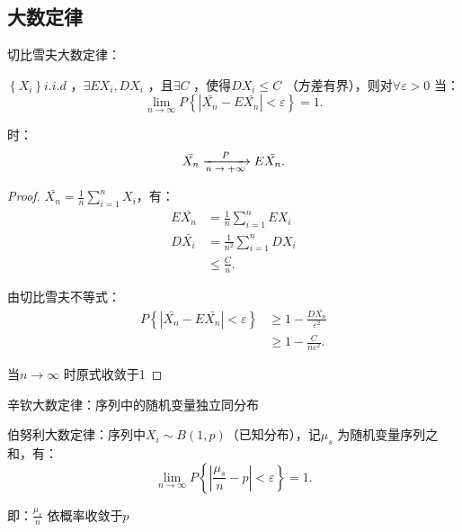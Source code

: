 \subsection{大数定律}%
\label{sub:大数定律}
\begin{notation}
    切比雪夫大数定律：
\end{notation}

\begin{defi}
    $\left\{ X_i \right\} i.i.d$ ，$\exists EX_i,DX_i$ ，且$\exists C$ ，使得$DX_i\le C$ （方差有界），则对$\forall \varepsilon>0$ 当：
    \[
        \lim_{n \to \infty} P\left\{ \left| \bar{X_n}-E\bar{X_n} \right| <\varepsilon \right\} =1
    .\] 

    时：
    \[
        \bar{X_n}\ce{->[$P$][$n\to +\infty $]}E\bar{X_n}
    .\] 
\end{defi}
\begin{proof}
    $\bar{X_n}=\displaystyle{\frac{1}{n} \sum_{i=1}^{n} X_i}$，有：
    \begin{align*}
        E\bar{X_n}&=\frac{1}{n} \sum_{i=1}^{n} EX_i\\
        D\bar{X_i}&=\frac{1}{n^2} \sum_{i=1}^{n} DX_i\\
                  &\le \frac{C}{n}
    .\end{align*}

    由切比雪夫不等式：
    \begin{align*}
        P\left\{ \left| \bar{X_n}-E\bar{X_n} \right| <\varepsilon \right\} &\ge 1-\frac{D\bar{X_n}}{\varepsilon^2}\\
                                                                        &\ge 1-\frac{C}{n\varepsilon^2}
    .\end{align*}

    当$n\to \infty $ 时原式收敛于1
\end{proof}
\begin{notation}
    辛钦大数定律：序列中的随机变量独立同分布
\end{notation}
\begin{notation}
    伯努利大数定律：序列中$X_i\sim B\left( 1,p \right) $（已知分布），记$\mu_s$ 为随机变量序列之和，有：
    \[
        \lim_{n \to \infty} P\left\{ \left| \frac{\mu_s}{n} -p  \right| <\varepsilon \right\} =1
    .\] 
    
    即：$\displaystyle{\frac{\mu_s}{n}} $ 依概率收敛于$p$
\end{notation}
